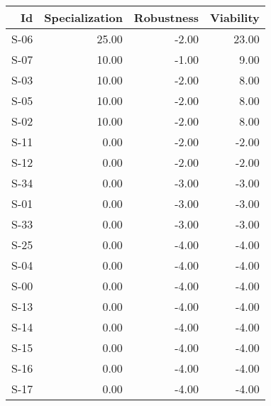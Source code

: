 \begin{tabular}{ | r | r | r | r | }
    \hline
                    Id  &  Specialization  &      Robustness  &       Viability  \\
    \hline
    \hline
                  S-06  &           25.00  &           -2.00  &           23.00  \\
    \hline
                  S-07  &           10.00  &           -1.00  &            9.00  \\
    \hline
                  S-03  &           10.00  &           -2.00  &            8.00  \\
    \hline
                  S-05  &           10.00  &           -2.00  &            8.00  \\
    \hline
                  S-02  &           10.00  &           -2.00  &            8.00  \\
    \hline
                  S-11  &            0.00  &           -2.00  &           -2.00  \\
    \hline
                  S-12  &            0.00  &           -2.00  &           -2.00  \\
    \hline
                  S-34  &            0.00  &           -3.00  &           -3.00  \\
    \hline
                  S-01  &            0.00  &           -3.00  &           -3.00  \\
    \hline
                  S-33  &            0.00  &           -3.00  &           -3.00  \\
    \hline
                  S-25  &            0.00  &           -4.00  &           -4.00  \\
    \hline
                  S-04  &            0.00  &           -4.00  &           -4.00  \\
    \hline
                  S-00  &            0.00  &           -4.00  &           -4.00  \\
    \hline
                  S-13  &            0.00  &           -4.00  &           -4.00  \\
    \hline
                  S-14  &            0.00  &           -4.00  &           -4.00  \\
    \hline
                  S-15  &            0.00  &           -4.00  &           -4.00  \\
    \hline
                  S-16  &            0.00  &           -4.00  &           -4.00  \\
    \hline
                  S-17  &            0.00  &           -4.00  &           -4.00  \\

\end{tabular}

